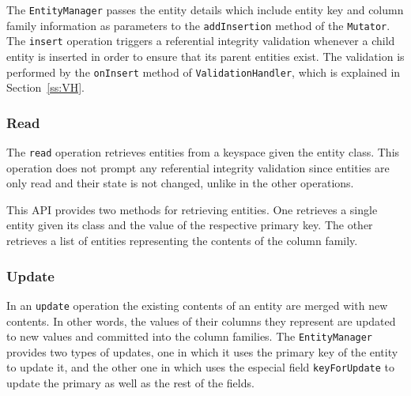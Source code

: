 		The \texttt{EntityManager} passes the entity details which include entity key
		and column family information as parameters to the \texttt{addInsertion}
		method of the \texttt{Mutator}.  The \texttt{insert} operation triggers a
		 referential integrity validation whenever a child entity is  inserted in
		 order to ensure that its parent entities exist. The validation is performed
		 by the \texttt{onInsert} method of \texttt{ValidationHandler}, which is
		explained in Section~\ref{ss:VH}.
	
		\subsubsection{Read}
		The  \texttt{read} operation retrieves  entities from a keyspace given the
		entity class. This operation does not prompt any referential integrity validation since
 		entities are only read and their state is not changed, unlike in the other
		operations.
		
		
		This \ac{API} provides two methods for retrieving entities. One retrieves a
		single entity given its class and the value of the respective primary key. The
		other retrieves a list of entities representing the contents of
		the column family.

		
		
		\subsubsection{Update}\label{ss:update}
		In an \texttt{update} operation the existing contents of an entity are merged
		with new contents.  In other words, the  values of their columns they
		represent are updated to new values and committed into the column families.  
		 The \texttt{EntityManager} provides two types of updates, one in which it
		 uses the primary key of the entity to update it, and the other one in
		 which uses the especial field \texttt{keyForUpdate} to update the primary as
		 well as the rest of the fields. 
		 
